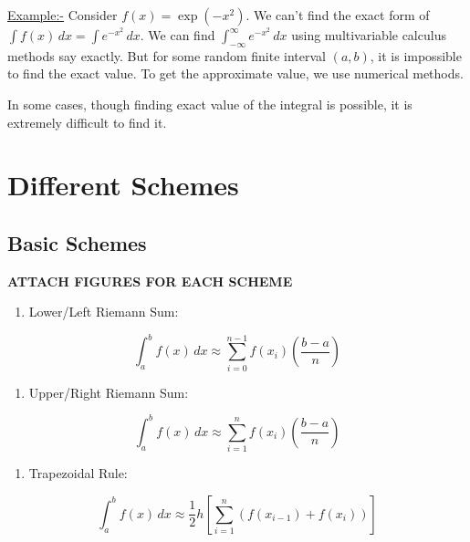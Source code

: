 \documentclass[
]{book}
\providecommand{\tightlist}{%
  \setlength{\itemsep}{0pt}\setlength{\parskip}{0pt}}
\begin{document}
\url{Example:-} Consider \(f(x) = \exp(-x^2)\). We can't find the exact form of \(\int f(x)\, dx = \int e^{-x^2}\, dx\). We can find \(\int_{-\infty}^{\infty} e^{-x^2}\, dx\) using multivariable calculus methods say exactly. But for some random finite interval \((a,b)\), it is impossible to find the exact value. To get the approximate value, we use numerical methods.

In some cases, though finding exact value of the integral is possible, it is extremely difficult to find it.

\hypertarget{different-schemes}{%
\section{Different Schemes}\label{different-schemes}}

\hypertarget{basic-schemes}{%
\subsection{Basic Schemes}\label{basic-schemes}}

\textbf{ATTACH FIGURES FOR EACH SCHEME}

\begin{enumerate}
\def\labelenumi{\arabic{enumi}.}
\tightlist
\item
  Lower/Left Riemann Sum:
\end{enumerate}

\begin{equation}
\int_a^b f(x) \, dx \approx \sum_{i=0}^{n-1} f(x_i) \left( \frac{b-a}{n} \right)
\end{equation}

\begin{enumerate}
\def\labelenumi{\arabic{enumi}.}
\setcounter{enumi}{1}
\tightlist
\item
  Upper/Right Riemann Sum:
\end{enumerate}

\begin{equation}
\int_a^b f(x) \, dx \approx \sum_{i=1}^{n} f(x_i) \left( \frac{b-a}{n} \right)
\end{equation}

\begin{enumerate}
\def\labelenumi{\arabic{enumi}.}
\setcounter{enumi}{2}
\tightlist
\item
  Trapezoidal Rule:
\end{enumerate}

\begin{equation}
\int_a^b f(x) \, dx \approx \frac{1}{2} h \left[ \sum_{i=1}^n (f(x_{i-1})+f(x_i)) \right]
\end{equation}
\end{document}
